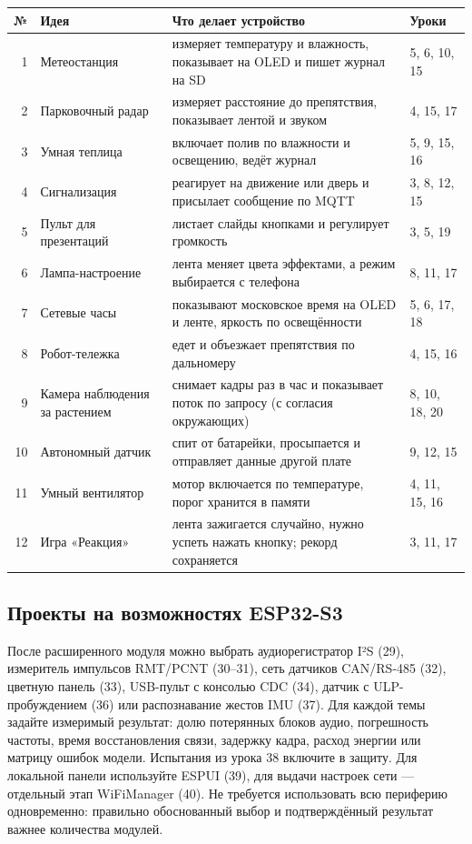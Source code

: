 \begin{center}\small
\begin{tabularx}{\textwidth}{@{}r X X l@{}}
\toprule
№ & Идея & Что делает устройство & Уроки \\
\midrule
1  & Метеостанция & измеряет температуру и влажность, показывает на OLED и пишет журнал на SD & 5, 6, 10, 15 \\
2  & Парковочный радар & измеряет расстояние до препятствия, показывает лентой и звуком & 4, 15, 17 \\
3  & Умная теплица & включает полив по влажности и освещению, ведёт журнал & 5, 9, 15, 16 \\
4  & Сигнализация & реагирует на движение или дверь и присылает сообщение по MQTT & 3, 8, 12, 15 \\
5  & Пульт для презентаций & листает слайды кнопками и регулирует громкость & 3, 5, 19 \\
6  & Лампа-настроение & лента меняет цвета эффектами, а режим выбирается с телефона & 8, 11, 17 \\
7  & Сетевые часы & показывают московское время на OLED и ленте, яркость по освещённости & 5, 6, 17, 18 \\
8  & Робот-тележка & едет и объезжает препятствия по дальномеру & 4, 15, 16 \\
9  & Камера наблюдения за растением & снимает кадры раз в час и показывает поток по запросу (с согласия окружающих) & 8, 10, 18, 20 \\
10 & Автономный датчик & спит от батарейки, просыпается и отправляет данные другой плате & 9, 12, 15 \\
11 & Умный вентилятор & мотор включается по температуре, порог хранится в памяти & 4, 11, 15, 16 \\
12 & Игра «Реакция» & лента зажигается случайно, нужно успеть нажать кнопку; рекорд сохраняется & 3, 11, 17 \\
\bottomrule
\end{tabularx}
\end{center}

\subsection{Проекты на возможностях ESP32-S3}
После расширенного модуля можно выбрать аудиорегистратор I²S (29), измеритель импульсов RMT/PCNT
(30--31), сеть датчиков CAN/RS-485 (32), цветную панель (33), USB-пульт с консолью CDC (34),
датчик с ULP-пробуждением (36) или распознавание жестов IMU (37).
Для каждой темы задайте измеримый результат: долю потерянных блоков аудио, погрешность частоты,
время восстановления связи, задержку кадра, расход энергии или матрицу ошибок модели.
Испытания из урока 38 включите в защиту. Для локальной панели используйте ESPUI (39),
для выдачи настроек сети --- отдельный этап WiFiManager (40). Не требуется использовать всю периферию одновременно:
правильно обоснованный выбор и подтверждённый результат важнее количества модулей.

